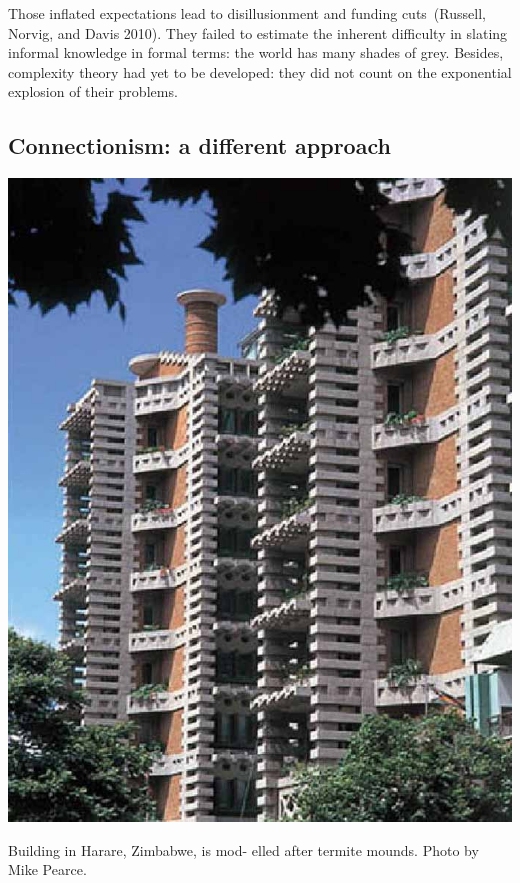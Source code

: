 \documentclass[
  letterpaper,
  12pt,
  british]{tufte-book}
\theoremstyle{plain}
\theoremstyle{plain}
\theoremstyle{definition}
\theoremstyle{remark}
\begin{document}
Those inflated expectations lead to disillusionment and funding
cuts~(Russell, Norvig, and
Davis
2010).
They failed to estimate the inherent difficulty in slating informal
knowledge in formal terms: the world has many shades of grey. Besides,
complexity theory had yet to be developed: they did not count on the
exponential explosion of their problems.

\hypertarget{connectionism-a-different-approach}{%
\subsection{Connectionism: a different
approach}\label{connectionism-a-different-approach}}

\begin{marginfigure}

{\centering \includegraphics{Images/arup_building.jpg}

}

\caption{Building in Harare, Zimbabwe, is mod- elled after termite
mounds. Photo by Mike Pearce.}

\end{marginfigure}
\end{document}
